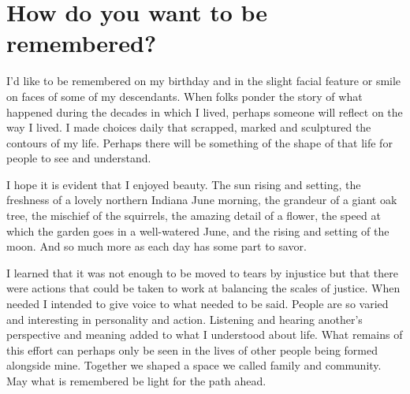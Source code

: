 \section{How do you want to be remembered?}
I'd like to be remembered on my birthday and in the slight facial feature or smile on faces of some of my descendants.
When folks ponder the story of what happened during the decades in which I lived, perhaps someone will reflect on the way I lived.
I made choices daily that scrapped, marked and sculptured the contours of my life.
Perhaps there will be something of the shape of that life for people to see and understand.

I hope it is evident that I enjoyed beauty.
The sun rising and setting, the freshness of a lovely northern Indiana June morning, the grandeur of a giant oak tree, the mischief of the squirrels, the amazing detail of a flower, the speed at which the garden goes in a well-watered June, and the rising and setting of the moon.
And so much more as each day has some part to savor.

I learned that it was not enough to be moved to tears by injustice but that there were actions that could be taken to work at balancing the scales of justice.
When needed I intended to give voice to what needed to be said.
People are so varied and interesting in personality and action.
Listening and hearing another's perspective and meaning added to what I understood about life.
What remains of this effort can perhaps only be seen in the lives of other people being formed alongside mine.
Together we shaped a space we called family and community.
May what is remembered be light for the path ahead.






